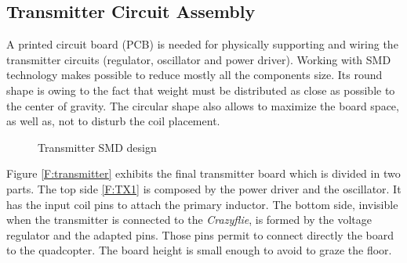   \subsection{Transmitter Circuit Assembly}
A printed circuit board (PCB) is needed for physically supporting and wiring the transmitter circuits (regulator, oscillator and power driver). Working with SMD technology makes possible to reduce mostly all the components size. Its round shape is owing to the fact that weight must be distributed as close as possible to the center of gravity. The circular shape also allows to maximize the board space, as well as, not to disturb the coil placement.


\begin{figure}[H]
\centering
\begin{subfigmatrix}{2} 
\hspace*{\fill}
\hfill
{}
\hspace*{\fill}
\end{subfigmatrix}
\caption{Transmitter SMD design}
\end{figure}

Figure \ref{F:transmitter} exhibits the final transmitter board which is divided in two parts. The top side \ref{F:TX1} is composed by the power driver and the oscillator. It has the input coil pins to attach the primary inductor. The bottom side, invisible when the transmitter is connected to the \textit{Crazyflie}, is formed by the voltage regulator and the adapted pins. Those pins permit to connect directly the board to the quadcopter. The board height is small enough to avoid to graze the floor.


